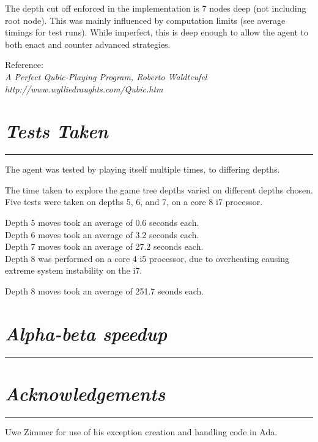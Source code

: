 \documentclass[10pt]{report}
\begin{document}
\begin{multicols}{2}
The depth cut off enforced in the implementation is 7 nodes deep (not including root node). This was mainly influenced by computation limits (see average timings for test runs). While imperfect, this is deep enough to allow the agent to both enact and counter advanced strategies.

Reference: \\
\em A Perfect Qubic-Playing Program\em, Roberto Waldteufel\\
http://www.wylliedraughts.com/Qubic.htm

\section*{\emph{{Tests Taken}}}
\hrule
\vspace{0.4cm}

The agent was tested by playing itself multiple times, to differing depths.

The time taken to explore the game tree depths varied on different depths chosen. Five tests were taken on depths 5, 6, and 7, on a core 8 i7 processor.

Depth 5 moves took an average of 0.6 seconds each.\\
Depth 6 moves took an average of 3.2 seconds each.\\
Depth 7 moves took an average of 27.2 seconds each.\\

Depth 8 was performed on a core 4 i5 processor, due to overheating causing extreme system instability on the i7.

Depth 8 moves took an average of 251.7 seonds each.

\section*{\emph{\textmd{Alpha-beta speedup}}}
\hrule
\vspace{0.4cm}

\section*{\emph{\textmd{Acknowledgements}}}
\hrule
\vspace{0.4cm}

Uwe Zimmer for use of his exception creation and handling code in Ada.

\end{multicols}
\end{document}
